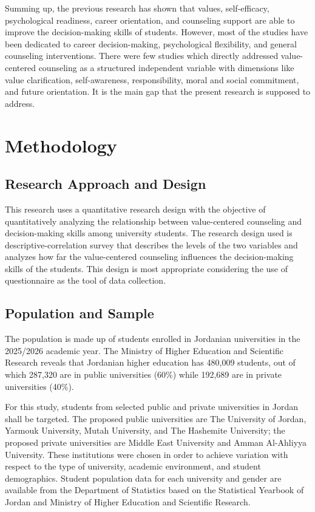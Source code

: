 \documentclass[10pt]{NSP1}
\begin{document}
Summing up, the previous research has shown that values, self-efficacy, psychological readiness, career orientation, and counseling support are able to improve the decision-making skills of students. However, most of the studies have been dedicated to career decision-making, psychological flexibility, and general counseling interventions. There were few studies which directly addressed value-centered counseling as a structured independent variable with dimensions like value clarification, self-awareness, responsibility, moral and social commitment, and future orientation. It is the main gap that the present research is supposed to address.

\section{Methodology}

\subsection{Research Approach and Design}

This research uses a quantitative research design with the objective of quantitatively analyzing the relationship between value-centered counseling and decision-making skills among university students. The research design used is descriptive-correlation survey that describes the levels of the two variables and analyzes how far the value-centered counseling influences the decision-making skills of the students. This design is most appropriate considering the use of questionnaire as the tool of data collection.

\subsection{Population and Sample}

The population is made up of students enrolled in Jordanian universities in the 2025/2026 academic year. The Ministry of Higher Education and Scientific Research reveals that Jordanian higher education has 480,009 students, out of which 287,320 are in public universities (60\%) while 192,689 are in private universities (40\%).

For this study, students from selected public and private universities in Jordan shall be targeted. The proposed public universities are The University of Jordan, Yarmouk University, Mutah University, and The Hashemite University; the proposed private universities are Middle East University and Amman Al-Ahliyya University. These institutions were chosen in order to achieve variation with respect to the type of university, academic environment, and student demographics. Student population data for each university and gender are available from the Department of Statistics based on the Statistical Yearbook of Jordan and Ministry of Higher Education and Scientific Research.
\end{document}
